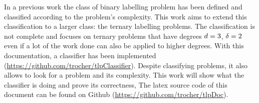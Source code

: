 In a previous work \cite{1} the class of binary labelling problem has been defined and classified according to the problem's complexity. This work aims to extend this classification to a larger class: the ternary labelling problems. The classification is not complete and focuses on ternary problems that have degrees $d = 3$, $\delta = 2$ even if a lot of the work done can also be applied to higher degrees. With this documentation, a classifier has been implemented (\href{https://github.com/trocher/tlpClassifier}{https://github.com/trocher/tlpClassifier}). Despite classifying problems, it also allows to look for a problem and its complexity. This work will show what the classifier is doing and prove its correctness, The latex source code of this document can be found on Github (\href{https://github.com/trocher/tlpDoc}{https://github.com/trocher/tlpDoc}).


